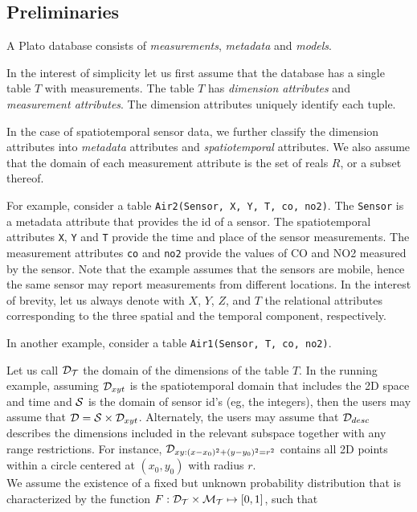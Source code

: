 \subsection{Preliminaries}
\label{sec:prelims}

A Plato database consists of {\em measurements}, {\em metadata} and {\em models}.

 In the interest of simplicity let us first assume that the database has a single table $T$ with measurements. The table $T$ has {\em dimension attributes} and {\em measurement attributes}. The dimension attributes uniquely identify each tuple.

In the case of spatiotemporal sensor data, we further classify the dimension attributes into {\em metadata} attributes and {\em spatiotemporal} attributes. We also assume that the domain of each measurement attribute is the set of reals $R$, or a subset thereof.

For example, consider a table \texttt{Air2(Sensor, X, Y, T, co, no2)}. The \texttt{Sensor} is a metadata attribute that provides the id of a sensor. The spatiotemporal attributes \texttt{X}, \texttt{Y} and \texttt{T} provide the time and place of the sensor measurements. The measurement attributes \texttt{co} and \texttt{no2} provide the values of CO and NO2 measured by the sensor. Note that the example assumes that the sensors are mobile, hence the same sensor may report measurements from different locations. In the interest of brevity, let us always denote with $X$, $Y$, $Z$, and $T$ the relational attributes corresponding to the three spatial and the temporal component, respectively.

In another example, consider a table \texttt{Air1(Sensor, T, co, no2)}.

Let us call ${\cal D_T}$ the domain of the dimensions of the table $T$. In the running example, assuming ${\cal D}_{xyt}$ is the spatiotemporal domain that includes the 2D space and time and ${\cal S}$ is the domain of sensor id's (eg, the integers), then the users may assume that ${\cal D} = {\cal S} \times {\cal D}_{xyt}$. Alternately, the users may assume  that ${\cal D}_{desc}$ describes the dimensions included in the relevant subspace together with any range restrictions. For instance, ${\cal D}_{xy: (x-x_0)^2+(y-y_0)^2 = r^2}$ contains all 2D points within a circle centered at $(x_0, y_0)$ with radius $r$. \\

We assume the existence of a fixed but unknown probability distribution that is characterized by the function $F: {\cal D_T} \times {\cal M_T} \mapsto [0,1]$, such that 

